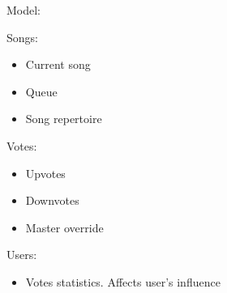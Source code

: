 \label{sec:architecture}


Model:

Songs:
\begin{itemize}
  \item Current song
  \item Queue
  \item Song repertoire
\end{itemize}

Votes:
\begin{itemize}
  \item Upvotes
  \item Downvotes
  \item Master override
\end{itemize}

Users:
\begin{itemize}
  \item Votes statistics. Affects user's influence
\end{itemize}